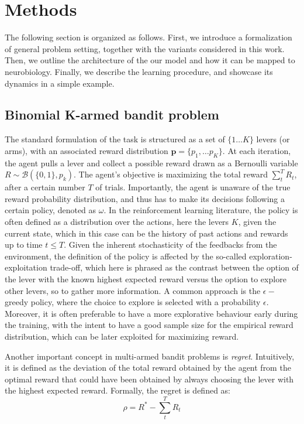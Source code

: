 

\section{Methods}

\noindent The following section is organized as follows. First, we introduce a formalization of general problem setting, together with the variants considered in this work. Then, we outline the architecture of the our model and how it can be mapped to neurobiology. Finally, we describe the learning procedure,
and showcase its dynamics in a simple example.

\subsection{Binomial K-armed bandit problem}
\hfill \break
\noindent The standard formulation of the task is structured as a set of $\{1\dots K\}$ levers (or arms), with an associated reward distribution $\mathbf{p}=\{p_{1}, \ldots p_{K}\}$. At each iteration, the agent pulls a lever and collect a possible reward drawn as a Bernoulli variable $R\sim
\mathcal{B}(\{0,1\},p_{k})$. The agent's objective is maximizing the total reward
$\sum^{T}_{t} R_{t}$, after a certain number $T$ of trials.
Importantly, the agent is unaware of the true reward probability distribution, and thus has to make its decisions following a certain policy, denoted as $\omega$. In the reinforcement learning literature, the policy is often defined as
a distribution over the actions, here the levers $K$, given the current state, which in this case can be the history of past actions and rewards up to time $t\leq T$.
Given the inherent stochasticity of the feedbacks from the environment, the definition of the policy is affected by the so-called exploration-exploitation trade-off, which here is phrased as the contrast between the option of the lever with the known highest expected reward versus the option to explore other levers, so to gather more information.
A common approach is the $\epsilon-$greedy policy, where the choice to explore is selected with a probability $\epsilon$.
Moreover, it is often preferable to have a more explorative behaviour early during the training, with the intent to have a good sample size for the empirical reward distribution, which can be later exploited for maximizing reward.

Another important concept in multi-armed bandit problems is \textit{regret}. Intuitively, it is defined as the deviation of the total reward obtained by the agent from the optimal reward that could have been obtained by always choosing the lever with the highest expected reward.
Formally, the regret is defined as:
\begin{equation}
    \rho=R^{*} - \sum^{T}_{t} R_{t}
\end{equation}


